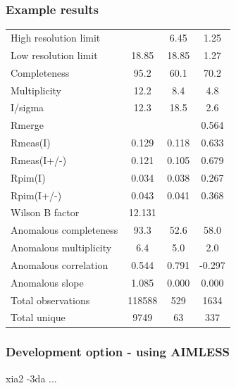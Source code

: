 \documentclass[slides,compress]{beamer}
\begin{document}
\begin{frame}
\frametitle{Example results}
\begin{tabular}{lccc}
High resolution limit      &       \color{red}{1.25} &    6.45 &   1.25\\
Low resolution limit       &                18.85  & 18.85  &  1.27\\
Completeness               &                95.2   & 60.1  &  70.2\\
Multiplicity               &               12.2    & 8.4   &  4.8\\
I/sigma                    &               12.3    & 18.5   &  2.6\\
Rmerge                     &             \color{red}{0.113}  & 
\color{red}{0.096} &  0.564\\
Rmeas(I)                   &             0.129  & 0.118 &  0.633\\
Rmeas(I+/-)                &             0.121  & 0.105 &  0.679\\
Rpim(I)                    &             0.034  & 0.038 &  0.267\\
Rpim(I+/-)                 &             0.043  & 0.041 &  0.368\\
Wilson B factor            &            12.131& & \\
Anomalous completeness     &            93.3  &  52.6  &  58.0\\
Anomalous multiplicity     &           6.4    & 5.0  &   2.0\\
Anomalous correlation      &            0.544 &  0.791 & -0.297\\
Anomalous slope            &      1.085 &  0.000 &  0.000\\
Total observations         &       118588 & 529  &   1634\\
Total unique               &         9749  &  63 &     337\\
\end{tabular}
\end{frame}

\begin{frame}
\frametitle{Development option - using AIMLESS}
{ \huge
xia2 -3da ...
}
\end{frame}
\end{document}
